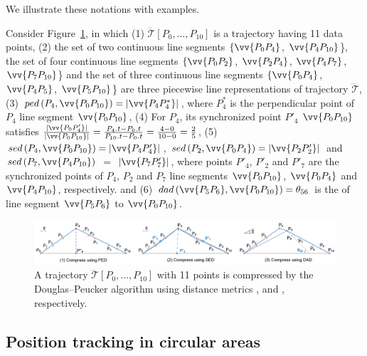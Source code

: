 We illustrate these notations with examples.

\begin{example}
	\label{exm-notations}
	Consider {Figure}~\ref{fig:dp}, in which
	(1) $\dddot{\mathcal{T}}\left[P_0, \ldots, P_{10}\right]$ is a trajectory having 11 data points,
	(2) the set of two continuous line segments $\{\vv{P_0P_4}$, $\vv{P_4P_{10}}$\}, the set of four continuous line segments $\{\vv{P_0P_2}$, $\vv{P_2P_4}$, $\vv{P_4P_7}$, $\vv{P_7P_{10}}$\} and the set of three continuous line segments $\{\vv{P_0P_4}$, $\vv{P_4P_5}$, $\vv{P_5P_{10}}$\} are three piecewise line representations of trajectory $\dddot{\mathcal{T}}$,
	(3) $ped\left(P_4, \vv{P_0P_{10}}\right)=|\vv{P_4P^*_4}|$, where $P^*_4$ is the perpendicular point of $P_4$ \wrt line segment $\vv{P_0P_{10}}$,
	(4) For $P_4$, its synchronized point $P'_4$ \wrt $\vv{P_0P_{10}}$ satisfies $\frac{|\vv{P_0P'_4}|}{|\vv{P_0P_{10}}|} = \frac{P_4.t - P_0.t}{P_{10}.t-P_0.t} = \frac{4-0}{10-0}= \frac{2}{5}$,
	(5) $sed\left(P_4, \vv{P_0P_{10}}\right)= |\vv{P_4P'_4}|$, $sed\left(P_2, \vv{P_0P_{4}}\right)= |\vv{P_2P'_2}|$ and $sed\left(P_7, \vv{P_4P_{10}}\right)$ $=$ $|\vv{P_7P'_7}|$,
	where points $P'_4$, $P'_2$ and $P'_7$ are the synchronized points of $P_4$, $P_2$ and $P_7$ \wrt line segments $\vv{P_0P_{10}}$, $\vv{P_0P_{4}}$ and $\vv{P_4P_{10}}$, respectively.  and
	(6) $dad\left(\vv{P_5P_6}, \vv{P_0P_{10}}\right)=\theta_{56}$ is the \dad of line segment $\vv{P_5P_6}$ to $\vv{P_0P_{10}}$.
\end{example}


\begin{figure}[tb!]
	\centering
	\includegraphics[scale=0.46]{Figures/Fig-DP.png}\vspace{-1ex}
	\caption{\small  A trajectory $\dddot{\mathcal{T}}[P_0, \ldots, P_{10}]$ with 11 points is compressed by the Douglas--Peucker algorithm \cite{Douglas:Peucker} using distance metrics \ped, \sed and \dad, respectively.}
	\vspace{-2ex}
	\label{fig:dp}
\end{figure}


\subsection{Position tracking in circular areas}

